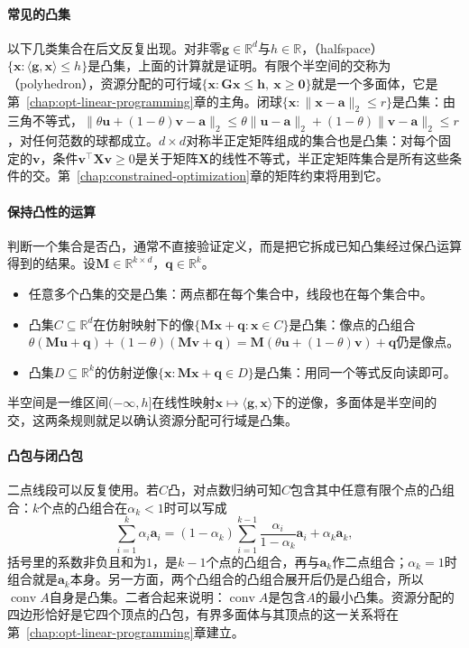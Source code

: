 \paragraph{常见的凸集}
以下几类集合在后文反复出现。对非零$\bm g\in\mathbb R^d$与$h\in\mathbb R$，（halfspace）$\{\bm x:\langle\bm g,\bm x\rangle\leq h\}$是凸集，上面的计算就是证明。有限个半空间的交称为（polyhedron），资源分配的可行域$\{\bm x:\bm G\bm x\leq\bm h,\ \bm x\geq\bm 0\}$就是一个多面体，它是第~\ref{chap:opt-linear-programming}章的主角。闭球$\{\bm x:\lVert\bm x-\bm a\rVert_2\leq r\}$是凸集：由三角不等式，$\lVert\theta\bm u+(1-\theta)\bm v-\bm a\rVert_2\leq\theta\lVert\bm u-\bm a\rVert_2+(1-\theta)\lVert\bm v-\bm a\rVert_2\leq r$，对任何范数的球都成立。$d\times d$对称半正定矩阵组成的集合也是凸集：对每个固定的$\bm v$，条件$\bm v^\top\bm X\bm v\geq0$是关于矩阵$\bm X$的线性不等式，半正定矩阵集合是所有这些条件的交。第~\ref{chap:constrained-optimization}章的矩阵约束将用到它。

\paragraph{保持凸性的运算}
判断一个集合是否凸，通常不直接验证定义，而是把它拆成已知凸集经过保凸运算得到的结果。设$\bm M\in\mathbb R^{k\times d}$，$\bm q\in\mathbb R^k$。
\begin{itemize}
  \item 任意多个凸集的交是凸集：两点都在每个集合中，线段也在每个集合中。
  \item 凸集$C\subseteq\mathbb R^d$在仿射映射下的像$\{\bm M\bm x+\bm q:\bm x\in C\}$是凸集：像点的凸组合$\theta(\bm M\bm u+\bm q)+(1-\theta)(\bm M\bm v+\bm q)=\bm M(\theta\bm u+(1-\theta)\bm v)+\bm q$仍是像点。
  \item 凸集$D\subseteq\mathbb R^k$的仿射逆像$\{\bm x:\bm M\bm x+\bm q\in D\}$是凸集：用同一个等式反向读即可。
\end{itemize}
半空间是一维区间$(-\infty,h]$在线性映射$\bm x\mapsto\langle\bm g,\bm x\rangle$下的逆像，多面体是半空间的交，这两条规则就足以确认资源分配可行域是凸集。

\paragraph{凸包与闭凸包}
二点线段可以反复使用。若$C$凸，对点数归纳可知$C$包含其中任意有限个点的凸组合：$k$个点的凸组合在$\alpha_k<1$时可以写成
\[
  \sum_{i=1}^k\alpha_i\bm a_i=(1-\alpha_k)\sum_{i=1}^{k-1}\frac{\alpha_i}{1-\alpha_k}\bm a_i+\alpha_k\bm a_k,
\]
括号里的系数非负且和为$1$，是$k-1$个点的凸组合，再与$\bm a_k$作二点组合；$\alpha_k=1$时组合就是$\bm a_k$本身。另一方面，两个凸组合的凸组合展开后仍是凸组合，所以$\operatorname{conv}A$自身是凸集。二者合起来说明：$\operatorname{conv}A$是包含$A$的最小凸集。资源分配的四边形恰好是它四个顶点的凸包，有界多面体与其顶点的这一关系将在第~\ref{chap:opt-linear-programming}章建立。

